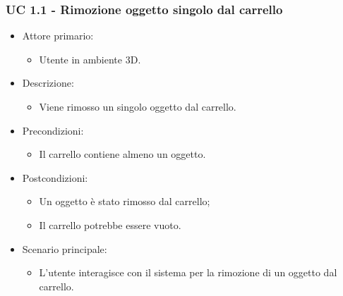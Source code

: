 \subsubsection{UC 1.1 - Rimozione oggetto singolo dal carrello}

\begin{itemize}
	
	\item Attore primario: 
	\begin{itemize}
		\item Utente in ambiente 3D.
	\end{itemize}
	\item Descrizione:
	\begin{itemize}
		\item Viene rimosso un singolo oggetto dal carrello.
	\end{itemize}
	
	\item Precondizioni:
	\begin{itemize}
		\item Il carrello contiene almeno un oggetto.
	\end{itemize}
	
	\item Postcondizioni:
	\begin{itemize}
		\item Un oggetto è stato rimosso dal carrello;
		\item Il carrello potrebbe essere vuoto.
	\end{itemize}
	
	\item Scenario principale:
	\begin{itemize}
		\item L'utente interagisce con il sistema per la rimozione di un oggetto dal carrello.
	\end{itemize}
	
\end{itemize}

